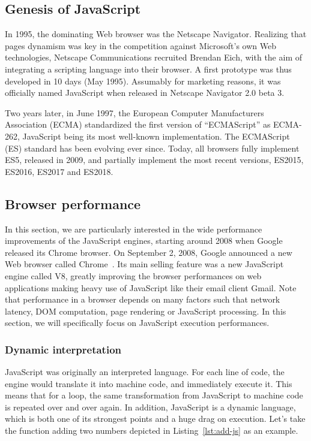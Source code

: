 \subsection{Genesis of JavaScript}%
\label{sub:genesis_of_javascript}

In 1995, the dominating Web browser was the Netscape Navigator.
Realizing that pages dynamism was key in the competition against Microsoft's
own Web technologies, Netscape Communications recruited Brendan Eich,
with the aim of integrating a scripting language into their browser.
A first prototype was thus developed in 10 days (May 1995).
Assumably for marketing reasons, it was officially named JavaScript
when released in Netscape Navigator 2.0 beta 3.

Two years later, in June 1997, the European Computer Manufacturers Association
(ECMA) standardized the first version of ``ECMAScript'' as ECMA-262,
JavaScript being its most well-known implementation.
The ECMAScript (ES) standard has been evolving ever since.
Today, all browsers fully implement ES5, released in 2009,
and partially implement the most recent versions, ES2015,
ES2016, ES2017 and ES2018.

\subsection{Browser performance}%
\label{sub:browser_performance}

In this section, we are particularly interested
in the wide performance improvements of the JavaScript engines,
starting around 2008 when Google released its Chrome browser.
On September 2, 2008, Google announced a new Web browser called Chrome~\cite{google-chrome}.
Its main selling feature was a new JavaScript engine called V8,
greatly improving the browser performances on web applications making
heavy use of JavaScript like their email client Gmail.
Note that performance in a browser depends on many factors
such that network latency, DOM computation, page rendering or JavaScript processing.
In this section, we will specifically focus on JavaScript execution performances.

\subsubsection{Dynamic interpretation}%
\label{ssub:dynamic-interpretation}

JavaScript was originally an interpreted language.
For each line of code, the engine would translate it into machine code,
and immediately execute it.
This means that for a loop, the same transformation from JavaScript to machine code
is repeated over and over again.
In addition, JavaScript is a dynamic language, which is both one of its
strongest points and a huge drag on execution.
Let's take the function adding two numbers
depicted in Listing~\ref{lst:add-js} as an example.

